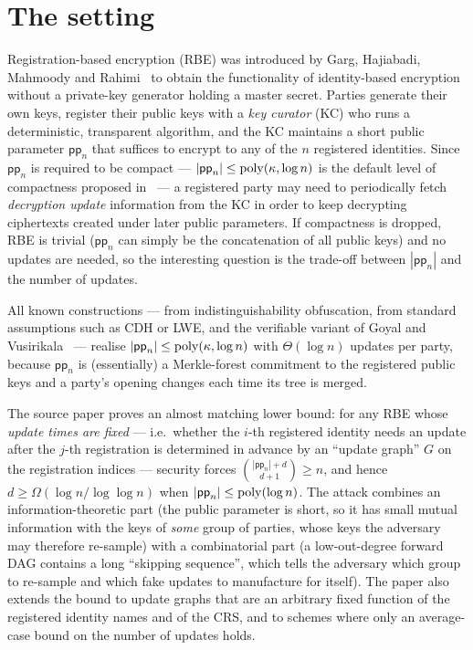 \documentclass{aicr-conjecture}
\newcommand{\pp}{\mathsf{pp}}
\begin{document}
\section{The setting}\label{sec:setting}

Registration-based encryption (RBE) was introduced by Garg, Hajiabadi,
Mahmoody and Rahimi~\cite{GHMR18} to obtain the functionality of
identity-based encryption without a private-key generator holding a
master secret. Parties generate their own keys, register their public
keys with a \emph{key curator} (KC) who runs a deterministic,
transparent algorithm, and the KC maintains a short public parameter
$\pp_n$ that suffices to encrypt to any of the $n$ registered
identities. Since $\pp_n$ is required to be compact ---
$|\pp_n| \le \poly(\kappa,\log n)$ is the default level of compactness
proposed in~\cite{GHMR18} --- a registered party may need to
periodically fetch \emph{decryption update} information from the KC in
order to keep decrypting ciphertexts created under later public
parameters. If compactness is dropped, RBE is trivial ($\pp_n$ can
simply be the concatenation of all public keys) and no updates are
needed, so the interesting question is the trade-off between $|\pp_n|$
and the number of updates.

All known constructions --- \cite{GHMR18} from indistinguishability
obfuscation, \cite{GHM19} from standard assumptions such as CDH or LWE,
and the verifiable variant of Goyal and Vusirikala~\cite{GV20} ---
realise $|\pp_n| \le \poly(\kappa,\log n)$ with $\Theta(\log n)$ updates
per party, because $\pp_n$ is (essentially) a Merkle-forest commitment
to the registered public keys and a party's opening changes each time
its tree is merged.

The source paper proves an almost matching lower bound: for any RBE
whose \emph{update times are fixed} --- i.e.\ whether the $i$-th
registered identity needs an update after the $j$-th registration is
determined in advance by an ``update graph'' $G$ on the registration
indices --- security forces $\binom{|\pp_n| + d}{d+1} \ge n$, and hence
$d \ge \Omega(\log n/\log\log n)$ when $|\pp_n| \le \poly(\log n)$. The
attack combines an information-theoretic part (the public parameter is
short, so it has small mutual information with the keys of \emph{some}
group of parties, whose keys the adversary may therefore re-sample) with
a combinatorial part (a low-out-degree forward DAG contains a long
``skipping sequence'', which tells the adversary which group to
re-sample and which fake updates to manufacture for itself). The paper
also extends the bound to update graphs that are an arbitrary fixed
function of the registered identity names and of the CRS, and to schemes
where only an average-case bound on the number of updates holds.
\end{document}
